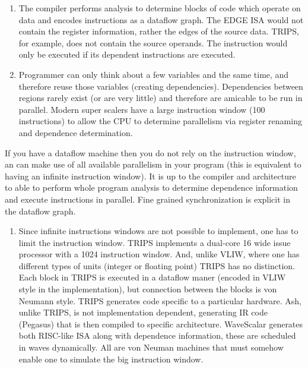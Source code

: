 \begin{enumerate}
\def\labelenumi{\alph{enumi}.}
\item
  The compiler performs analysis to determine blocks of code which
  operate on data and encodes instructions as a dataflow graph. The EDGE
  ISA would not contain the register information, rather the edges of
  the source data. TRIPS, for example, does not contain the source
  operands. The instruction would only be executed if its dependent
  instructions are executed.
\item
  Programmer can only think about a few variables and the same time, and
  therefore reuse those variables (creating dependencies). Dependencies
  between regions rarely exist (or are very little) and therefore are
  amicable to be run in parallel. Modern super scalers have a large
  instruction window (100 instructions) to allow the CPU to determine
  parallelism via register renaming and dependence determination.
\end{enumerate}

If you have a dataflow machine then you do not rely on the instruction
window, an can make use of all available parallelism in your program
(this is equivalent to having an infinite instruction window). It is up
to the compiler and architecture to able to perform whole program
analysis to determine dependence information and execute instructions in
parallel. Fine grained synchronization is explicit in the dataflow
graph.

\begin{enumerate}
\def\labelenumi{\alph{enumi}.}
\setcounter{enumi}{2}
\itemsep1pt\parskip0pt
\item
  Since infinite instructions windows are not possible to implement, one
  has to limit the instruction window. TRIPS implements a dual-core 16
  wide issue processor with a 1024 instruction window. And, unlike VLIW,
  where one has different types of units (integer or floating point)
  TRIPS has no distinction. Each block in TRIPS is executed in a
  dataflow maner (encoded in VLIW style in the implementation), but
  connection between the blocks is von Neumann style. TRIPS generates
  code specific to a particular hardware. Ash, unlike TRIPS, is not
  implementation dependent, generating IR code (Pegasus) that is then
  compiled to specific architecture. WaveScalar generates both RISC-like
  ISA along with dependence information, these are scheduled in waves
  dynamically. All are von Neuman machines that must somehow enable one
  to simulate the big instruction window.
\end{enumerate}
